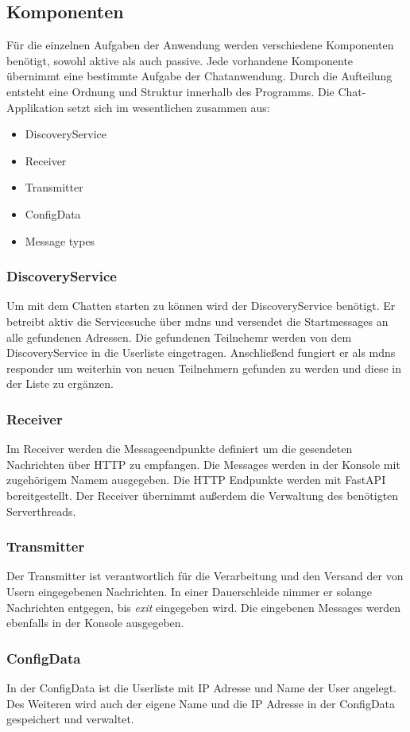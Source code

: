\subsection{Komponenten} 
Für die einzelnen Aufgaben der Anwendung werden verschiedene Komponenten benötigt, sowohl aktive als auch passive. Jede vorhandene Komponente übernimmt eine bestimmte Aufgabe der Chatanwendung. 
Durch die Aufteilung entsteht eine Ordnung und Struktur innerhalb des Programms. 
Die Chat-Applikation setzt sich im wesentlichen zusammen aus:
\begin{itemize}
    \item DiscoveryService 
    \item Receiver
    \item Transmitter
    \item ConfigData
    \item Message types
\end{itemize} 
\subsubsection{DiscoveryService}
Um mit dem Chatten starten zu können wird der DiscoveryService benötigt. 
Er betreibt aktiv die Servicesuche über mdns und versendet die Startmessages an alle gefundenen Adressen. Die gefundenen Teilnehemr werden von dem DiscoveryService in die Userliste eingetragen. 
Anschließend fungiert er als mdns responder um weiterhin von neuen Teilnehmern gefunden zu werden und diese in der Liste zu ergänzen. 
\subsubsection{Receiver}
Im Receiver werden die Messageendpunkte definiert um die gesendeten Nachrichten über HTTP zu empfangen. 
Die Messages werden in der Konsole mit zugehörigem Namem ausgegeben.
Die HTTP Endpunkte werden mit FastAPI bereitgestellt. Der Receiver übernimmt außerdem die Verwaltung des benötigten Serverthreads.  
\subsubsection{Transmitter}
Der Transmitter ist verantwortlich für die Verarbeitung und den Versand der von Usern eingegebenen Nachrichten. 
In einer Dauerschleide nimmer er solange Nachrichten entgegen, bis \emph{exit} eingegeben wird. Die eingebenen Messages werden ebenfalls in der Konsole ausgegeben.
\subsubsection{ConfigData}
In der ConfigData ist die Userliste mit IP Adresse und Name der User angelegt. Des Weiteren wird auch der eigene Name und die IP Adresse in der ConfigData gespeichert und verwaltet.
